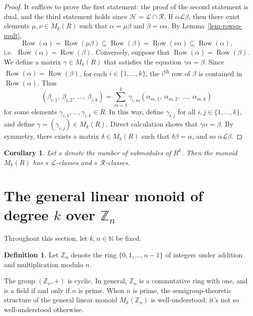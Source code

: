 \documentclass{article}
\newcommand{\N}{\mathbb{N}}
\renewcommand{\L}{\mathscr{L}}
\renewcommand{\H}{\mathscr{H}}
\newcommand{\R}{\mathscr{R}}
\newcommand{\rowsp}{\operatorname{Row}}
\newtheorem{cor}[thm]{Corollary}
\theoremstyle{definition}
\newtheorem{defn}[thm]{Definition}
\begin{document}
\begin{proof}
  It suffices to prove the first statement: the proof of the second statement is
  dual, and the third statement holds since $\H = \L \cap \R$.  If $\alpha \L
  \beta$, then there exist elements $\mu, \nu \in M_{k}(R)$ such
  that $\alpha = \mu \beta$ and $\beta = \nu \alpha$. By
  Lemma~\ref{lem-rowsp-mult},
  $$\rowsp(\alpha) = \rowsp(\mu \beta) \subseteq \rowsp(\beta) = \rowsp(\nu
  \alpha) \subseteq \rowsp(\alpha),$$
  i.e.\ $\rowsp(\alpha) = \rowsp(\beta)$.  Conversely, suppose that
  $\rowsp(\alpha) = \rowsp(\beta)$. We define a matrix $\gamma \in
  M_{k}(R)$ that satisfies the equation $\gamma \alpha = \beta$.
  Since $\rowsp(\alpha) = \rowsp(\beta)$, for each $i \in \{1, \ldots, k\}$, the
  $i$\textsuperscript{th} row of $\beta$ is contained in $\rowsp(\alpha)$.  Thus
  $$(\beta_{i, 1},\ \beta_{i, 2},\ \ldots,\ \beta_{i, k})
  =
  \displaystyle\sum_{m = 1}^{k} \gamma_{i, m} (\alpha_{m, 1},\ \alpha_{m, 2},\
  \ldots,\ \alpha_{m, k})
  $$
  for some elements $\gamma_{i, 1}, \ldots, \gamma_{i, k} \in R$.  In this way,
  define $\gamma_{i, j}$ for all $i, j \in \{1, \ldots, k\}$, and define $\gamma
  = (\gamma_{i, j}) \in M_{k}(R)$.  Direct calculation shows that $\gamma \alpha
  = \beta$. By symmetry, there exists a matrix $\delta \in M_{k}(R)$ such that
  $\delta \beta = \alpha$, and so $\alpha \L \beta$.
\end{proof}

\begin{cor}
  Let $s$ denote the number of submodules of $R^{k}$.  Then the
  monoid $M_{k}(R)$ has $s$ $\L$-classes and $s$ $\R$-classes.
\end{cor}

\clearpage
\section{The general linear monoid of degree $k$ over $\mathbb{Z}_{n}$}

Throughout this section, let $k, n \in \N$ be fixed.

\begin{defn}
  Let $\mathbb{Z}_{n}$ denote the ring $\{0, 1, \ldots, n - 1\}$ of integers
  under addition and multiplication modulo $n$.
\end{defn}

The group $(\mathbb{Z}_{n}, +)$ is cyclic.  In general, $\mathbb{Z}_{n}$ is a
commutative ring with one, and is a field if and only if $n$ is prime.  When $n$
is prime, the semigroup-theoretic structure of the general linear monoid
$M_{k}(\mathbb{Z}_{n})$ is well-understood; it's not so well-understood
otherwise.
\end{document}
